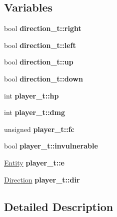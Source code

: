 \subsection*{Variables}
\begin{DoxyCompactItemize}
\item 
\mbox{\label{group__Player_gaf298bdf8fc20041fb83875aeb08f6b02}} 
bool {\bfseries direction\+\_\+t\+::right}
\item 
\mbox{\label{group__Player_ga273248d204d7fc6668014b08ca5b63e5}} 
bool {\bfseries direction\+\_\+t\+::left}
\item 
\mbox{\label{group__Player_gaf7e8668939fbfa13a63298685e40efaa}} 
bool {\bfseries direction\+\_\+t\+::up}
\item 
\mbox{\label{group__Player_gaea23977a22aa56664d49cdb5efced083}} 
bool {\bfseries direction\+\_\+t\+::down}
\item 
\mbox{\label{group__Player_gaa083ac58b52d8f8d75067dad9c09fdbc}} 
int {\bfseries player\+\_\+t\+::hp}
\item 
\mbox{\label{group__Player_gaa6f515056598ec49fc0d8d2f7a1f1b27}} 
int {\bfseries player\+\_\+t\+::dmg}
\item 
\mbox{\label{group__Player_ga79af67c1f85142728f17192410295f54}} 
unsigned {\bfseries player\+\_\+t\+::fc}
\item 
\mbox{\label{group__Player_ga69e12cd3d8f0f8ebda035c5fcfc9cb79}} 
bool {\bfseries player\+\_\+t\+::invulnerable}
\item 
\mbox{\label{group__Player_gabd5335d8984c5ee76c86abe3c62732ea}} 
\hyperlink{structentity__t}{Entity} {\bfseries player\+\_\+t\+::e}
\item 
\mbox{\label{group__Player_ga8a4b6e662dd82367bb528a5abf92b668}} 
\hyperlink{structdirection__t}{Direction} {\bfseries player\+\_\+t\+::dir}
\end{DoxyCompactItemize}


\subsection{Detailed Description}
